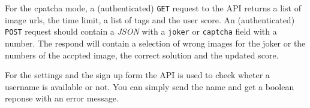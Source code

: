 For the cpatcha mode, a (authenticated) \texttt{GET} request to the API returns a list of image urls, the time limit, a list of tags and the user score.
An (authenticated) \texttt{POST} request should contain a \textit{JSON} with a \texttt{joker} or \texttt{captcha} field with a number. The respond will contain a selection of wrong images for the joker or the numbers of the accpted image, the correct solution and the updated score.

For the settings and the sign up form the API is used to check wheter a username is available or not. You can simply send the name and get a boolean reponse with an error message.

